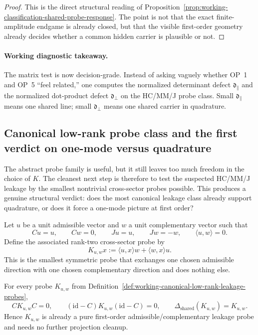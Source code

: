 \begin{proof}
This is the direct structural reading of Proposition~\ref{prop:working-classification-shared-probe-response}. The point is not that the exact finite-amplitude endgame is already closed, but that the visible first-order geometry already decides whether a common hidden carrier is plausible or not.
\end{proof}

\paragraph{Working diagnostic takeaway.}
The matrix test is now decision-grade. Instead of asking vaguely whether OP~1 and OP~5 ``feel related,'' one computes the normalized determinant defect $\mathfrak d_{\parallel}$ and the normalized dot-product defect $\mathfrak d_{\perp}$ on the HC/MM/J probe class. Small $\mathfrak d_{\parallel}$ means one shared line; small $\mathfrak d_{\perp}$ means one shared carrier in quadrature.


\subsection*{Canonical low-rank probe class and the first verdict on one-mode versus quadrature}
The abstract probe family is useful, but it still leaves too much freedom in the choice of $K$. The cleanest next step is therefore to test the suspected HC/MM/J leakage by the smallest nontrivial cross-sector probes possible. This produces a genuine structural verdict: does the most canonical leakage class already support quadrature, or does it force a one-mode picture at first order?

\begin{definition}
\label{def:working-canonical-low-rank-leakage-probes}
Let $u$ be a unit admissible vector and $w$ a unit complementary vector such that
\[
  Cu=u,
  \qquad
  Cw=0,
  \qquad
  Ju=u,
  \qquad
  Jw=-w,
  \qquad
  \langle u,w\rangle=0.
\]
Define the associated rank-two cross-sector probe by
\[
  K_{u,w}x
  :=
  \langle u,x\rangle w + \langle w,x\rangle u.
\]
This is the smallest symmetric probe that exchanges one chosen admissible direction with one chosen complementary direction and does nothing else.
\end{definition}

\begin{proposition}
\label{prop:working-exact-support-canonical-low-rank-probes}
For every probe $K_{u,w}$ from Definition~\ref{def:working-canonical-low-rank-leakage-probes},
\[
  CK_{u,w}C=0,
  \qquad
  (\mathrm{id}-C)K_{u,w}(\mathrm{id}-C)=0,
  \qquad
  \Delta_{\mathrm{shared}}(K_{u,w})=K_{u,w}.
\]
Hence $K_{u,w}$ is already a pure first-order admissible/complementary leakage probe and needs no further projection cleanup.
\end{proposition}

